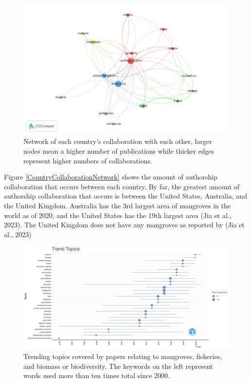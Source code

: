 \documentclass[
  12pt,
]{article}
\begin{document}
\begin{figure}
\includegraphics[width=1\linewidth]{CountryNetwork_VOS} \caption{Network of each country's collaboration with each other, larger nodes mean a higher number of publications while thicker edges represent higher numbers of collaborations. \label{CountryCollaborationNetwork}}\label{fig:CountryCollaborationNetwork}
\end{figure}



Figure \ref{CountryCollaborationNetwork} shows the amount of authorship collaboration that occurs between each country. By far, the greatest amount of authorship collaboration that occurs is between the United States, Australia, and the United Kingdom. Australia has the 3rd largest area of mangroves in the world as of 2020, and the United States has the 19th largest area (Jia et al., 2023). The United Kingdom does not have any mangroves as reported by (Jia et al., 2023)

\begin{figure}
\includegraphics[width=1\linewidth]{TrendTopics} \caption{Trending topics covered by papers relating to mangroves, fisheries, and biomass or biodiversity. The keywords on the left represent words used more than ten times total since 2000. \label{TrendTopics}}\label{fig:TrendTopics}
\end{figure}
\end{document}
